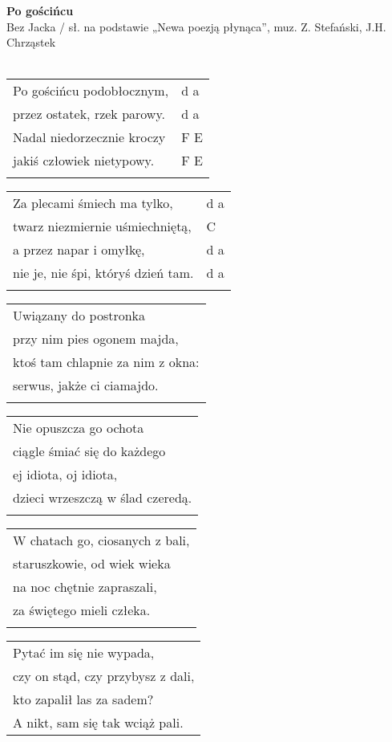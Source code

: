\documentclass[a5paper]{article}
\begin{document}


\noindent
\fontsize{12pt}{15pt}\selectfont
\textbf{Po gościńcu} \\
\fontsize{8pt}{10pt}\selectfont
Bez Jacka / sł. na podstawie „Newa poezją płynąca”, muz. Z. Stefański, J.H. Chrząstek\\ \\
\fontsize{10pt}{12pt}\selectfont
{}
\begin{tabular}{@{}p{7.50cm}p{3cm}@{}}
\noindent
Po gościńcu podobłocznym, & d a \\
przez ostatek, rzek parowy. & d a \\
Nadal niedorzecznie kroczy & F E \\
jakiś człowiek nietypowy. & F E \\ \\
\end{tabular}

\noindent
\begin{tabular}{@{}p{7.50cm}p{3cm}@{}}
Za plecami śmiech ma tylko, & d a \\
twarz niezmiernie uśmiechniętą, & C \\
a przez napar i omyłkę, & d a \\
nie je, nie śpi, któryś dzień tam. & d a \\ \\
\end{tabular}

\noindent
\begin{tabular}{@{}p{7.50cm}@{}}
Uwiązany do postronka \\
przy nim pies ogonem majda, \\
ktoś tam chlapnie za nim z okna: \\
serwus, jakże ci ciamajdo. \\ \\
\end{tabular}

\noindent
\begin{tabular}{@{}p{7.50cm}@{}}
Nie opuszcza go ochota \\
ciągle śmiać się do każdego \\ 
ej idiota, oj idiota, \\
dzieci wrzeszczą w ślad czeredą. \\ \\
\end{tabular}

\noindent
\begin{tabular}{@{}p{7.50cm}@{}}
W chatach go, ciosanych z bali, \\
staruszkowie, od wiek wieka \\
na noc chętnie zapraszali, \\
za świętego mieli człeka. \\ \\
\end{tabular}

\noindent
\begin{tabular}{@{}p{7.50cm}@{}}
Pytać im się nie wypada, \\
czy on stąd, czy przybysz z dali, \\
kto zapalił las za sadem? \\
A nikt, sam się tak wciąż pali.
\end{tabular}
\end{document}
